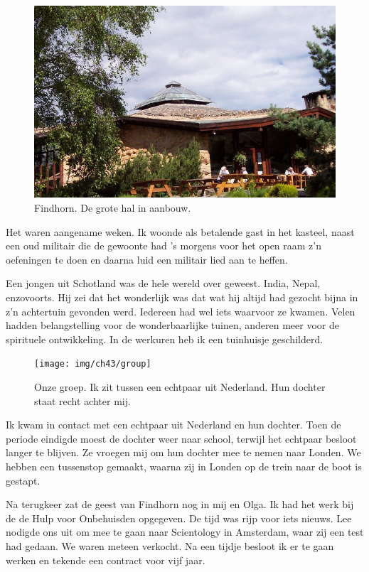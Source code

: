 \documentclass[10pt,twoside, openright]{memoir}
\begin{document}
\begin{figure}
\includegraphics[width=\textwidth]{img/ch43/hall}
\caption*{\footnotesize Findhorn. De grote hal in aanbouw.}
\end{figure}

Het waren aangename weken. Ik woonde als betalende gast in het kasteel, naast een oud militair die de gewoonte had ’s morgens voor het open raam z’n oefeningen te doen en daarna luid een militair lied aan te heffen. 

Een jongen uit Schotland was de hele wereld over geweest. India, Nepal, enzovoorts. Hij zei dat het wonderlijk was dat wat hij altijd had gezocht bijna in z’n achtertuin gevonden werd. Iedereen had wel iets waarvoor ze kwamen. Velen hadden belangstelling voor de wonderbaarlijke tuinen, anderen meer voor de spirituele ontwikkeling. In de werkuren heb ik een tuinhuisje geschilderd. 

\begin{figure}
\texttt{[image: img/ch43/group]}
\caption*{\footnotesize Onze groep. Ik zit tussen een echtpaar uit Nederland. Hun dochter staat recht achter mij.}
\end{figure}

Ik kwam in contact met een echtpaar uit Nederland en hun dochter. Toen de periode eindigde moest de dochter weer naar school, terwijl het echtpaar besloot langer te blijven. Ze vroegen mij om hun dochter mee te nemen naar Londen. We hebben een tussenstop gemaakt, waarna zij in Londen op de trein naar de boot is gestapt.

Na terugkeer zat de geest van Findhorn nog in mij en Olga. Ik had het werk bij de de Hulp voor Onbehuisden opgegeven. De tijd was rijp voor iets nieuws. Lee nodigde ons uit om mee te gaan naar Scientology in Amsterdam, waar zij een test had gedaan. We waren meteen verkocht. Na een tijdje besloot ik er te gaan werken en tekende een contract voor vijf jaar. 
\end{document}
